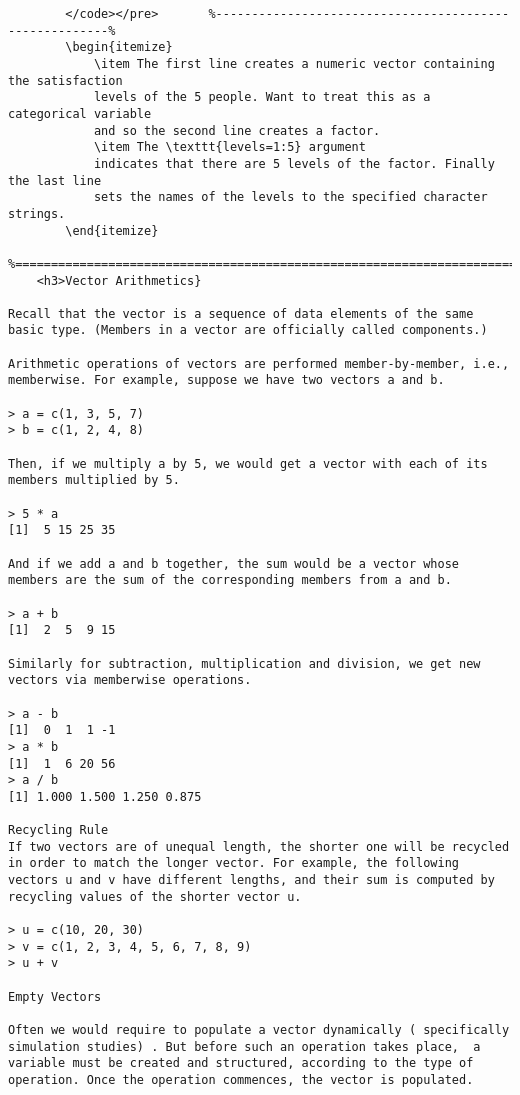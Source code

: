 \begin{itemize}
\begin{framed}
\begin{verbatim}
		</code></pre>		%-------------------------------------------------------%
		\begin{itemize}
			\item The first line creates a numeric vector containing the satisfaction
			levels of the 5 people. Want to treat this as a categorical variable
			and so the second line creates a factor. 
			\item The \texttt{levels=1:5} argument
			indicates that there are 5 levels of the factor. Finally the last line
			sets the names of the levels to the specified character strings.
		\end{itemize}
		%===========================================================================================%
	<h3>Vector Arithmetics}

Recall that the vector is a sequence of data elements of the same basic type. (Members in a vector are officially called components.)

Arithmetic operations of vectors are performed member-by-member, i.e., memberwise. For example, suppose we have two vectors a and b.

> a = c(1, 3, 5, 7) 
> b = c(1, 2, 4, 8)

Then, if we multiply a by 5, we would get a vector with each of its members multiplied by 5.

> 5 * a 
[1]  5 15 25 35

And if we add a and b together, the sum would be a vector whose members are the sum of the corresponding members from a and b.

> a + b 
[1]  2  5  9 15

Similarly for subtraction, multiplication and division, we get new vectors via memberwise operations.

> a - b 
[1]  0  1  1 -1 
> a * b 
[1]  1  6 20 56 
> a / b 
[1] 1.000 1.500 1.250 0.875

Recycling Rule
If two vectors are of unequal length, the shorter one will be recycled in order to match the longer vector. For example, the following vectors u and v have different lengths, and their sum is computed by recycling values of the shorter vector u.

> u = c(10, 20, 30) 
> v = c(1, 2, 3, 4, 5, 6, 7, 8, 9) 
> u + v 

Empty Vectors

Often we would require to populate a vector dynamically ( specifically simulation studies) . But before such an operation takes place,  a variable must be created and structured, according to the type of operation. Once the operation commences, the vector is populated. 


\end{verbatim}
\end{framed}
\end{itemize}
